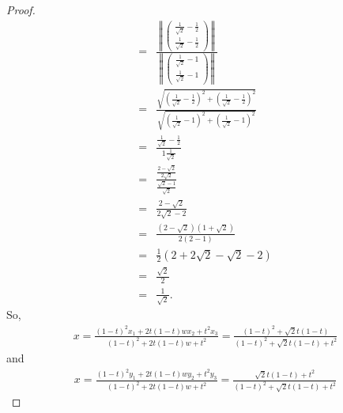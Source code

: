 \begin{proof}
\begin{align*}
    =& \frac{\left\|\left(\begin{array}{c} \frac{1}{\sqrt{2}} 
    - \frac{1}{2}\\ \frac{1}{\sqrt{2}} - \frac{1}{2}\end{array}\right)\right\|}{\left\|\left(\begin{array}{c} \frac{1}{\sqrt{2}} 
    - 1\\ \frac{1}{\sqrt{2}} 
    - 1\end{array}\right)\right\|}\\
    =& \frac{\sqrt{\left(\frac{1}{\sqrt{2}} 
    - \frac{1}{2}\right)^2 + \left(\frac{1}{\sqrt{2}} - \frac{1}{2}\right)^2}}{\sqrt{\left(\frac{1}{\sqrt{2}} - 1\right)^2 + \left(\frac{1}{\sqrt{2}} - 1\right)^2}}\\
    =& \frac{\frac{1}{\sqrt{2}} - \frac{1}{2}}{1 \frac{1}{\sqrt{2}}}\\
    =& \frac{\frac{2 - \sqrt{2}}{2\sqrt{2}}}{\frac{\sqrt{2} - 1}{\sqrt{2}}}\\
    =& \frac{2 - \sqrt{2}}{2\sqrt{2} - 2}\\
    =& \frac{(2 - \sqrt{2})(1 + \sqrt{2})}{2(2 - 1)}\\
    =& \frac{1}{2}(2 + 2\sqrt{2} - \sqrt{2} - 2)\\
    =& \frac{\sqrt{2}}{2}\\
    =& \frac{1}{\sqrt{2}}.    
\end{align*}
So,
\begin{align*}
    x 
    = \frac{(1- t)^2 x_1 + 2t(1-t)wx_2 + t^2 x_3}{(1- t)^2 + 2t(1-t)w + t^2} 
    = \frac{(1- t)^2 + \sqrt{2}t(1-t)}{(1- t)^2 + \sqrt{2}t(1-t) + t^2}
\end{align*}
and
\begin{align*}
    x = \frac{(1- t)^2 y_1 + 2t(1-t)wy_2 + t^2 y_3}{(1- t)^2 + 2t(1-t)w + t^2} = \frac{\sqrt{2}t(1-t) + t^2}{(1- t)^2 + \sqrt{2}t(1-t) + t^2}
\end{align*}
\end{proof}
